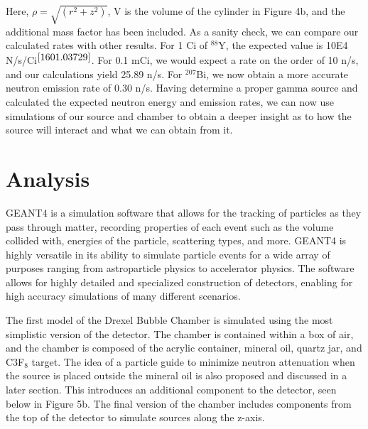 \documentclass[%
12pt,
twoside,
reprint,
amsmath,amssymb,
aps,
]{article}
\begin{document}
	\noindent Here, $\rho = \sqrt{(r^{2} + z^{2})}$, V is the volume of the cylinder in Figure 4b, and the additional mass factor has been included. As a sanity check, we can compare our calculated rates with other results. For 1 Ci of $^{88}$Y, the expected value is 10E4 N/s/Ci$^{\cite{1601.03729}}$. For 0.1 mCi, we would expect a rate on the order of 10 n/s, and our calculations yield 25.89 n/s. For $^{207}$Bi, we now obtain a more accurate neutron emission rate of 0.30 n/s. Having determine a proper gamma source and calculated the expected neutron energy and emission rates, we can now use simulations of our source and chamber to obtain a deeper insight as to how the source will interact and what we can obtain from it.

	\section{Analysis}
	\par GEANT4 is a simulation software that allows for the tracking of particles as they pass through matter, recording properties of each event such as the volume collided with, energies of the particle, scattering types, and more. GEANT4 is highly versatile in its ability to simulate particle events for a wide array of purposes ranging from astroparticle physics to accelerator physics. The software allows for highly detailed and specialized construction of detectors, enabling for high accuracy simulations of many different scenarios.
	\par The first model of the Drexel Bubble Chamber is simulated using the most simplistic version of the detector. The chamber is contained within a box of air, and the chamber is composed of the acrylic container, mineral oil, quartz jar, and C${3}$F$_{8}$ target. The idea of a particle guide to minimize neutron attenuation when the source is placed outside the mineral oil is also proposed and discussed in a later section. This introduces an additional component to the detector, seen below in Figure 5b. The final version of the chamber includes components from the top of the detector to simulate sources along the z-axis.
	
\end{document}
